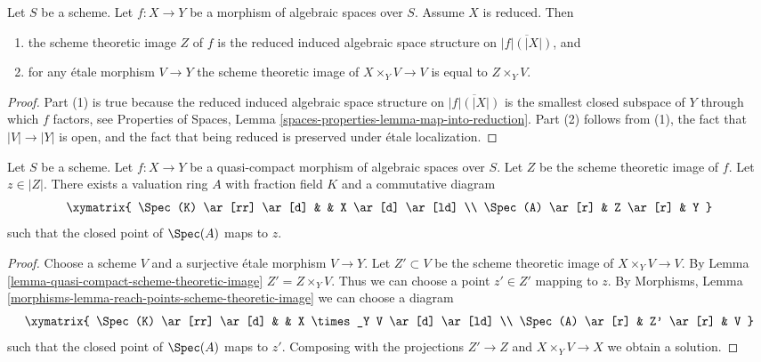 \begin{lemma}
\label{lemma-scheme-theoretic-image-reduced}
Let $S$ be a scheme. Let $f : X \to Y$ be a morphism of algebraic spaces
over $S$. Assume $X$ is reduced. Then
\begin{enumerate}
\item the scheme theoretic image $Z$ of $f$ is the reduced induced algebraic
space structure on $\overline{|f|(|X|)}$, and
\item for any \'etale morphism $V \to Y$ the scheme theoretic image of
$X \times_Y V \to V$ is equal to $Z \times_Y V$.
\end{enumerate}
\end{lemma}

\begin{proof}
Part (1) is true because the reduced induced algebraic space structure on
$\overline{|f|(|X|)}$ is the smallest closed subspace
of $Y$ through which $f$ factors, see
Properties of Spaces, Lemma \ref{spaces-properties-lemma-map-into-reduction}.
Part (2) follows from (1), the fact that $|V| \to |Y|$ is open, and the
fact that being reduced is preserved under \'etale localization.
\end{proof}

\begin{lemma}
\label{lemma-reach-points-scheme-theoretic-image}
Let $S$ be a scheme.
Let $f : X \to Y$ be a quasi-compact morphism of algebraic spaces over $S$.
Let $Z$ be the scheme theoretic image of $f$.
Let $z \in |Z|$. There exists a valuation ring $A$ with
fraction field $K$ and a commutative diagram
$$
\xymatrix{
\Spec(K) \ar[rr] \ar[d] & & X \ar[d] \ar[ld] \\
\Spec(A) \ar[r] & Z \ar[r] & Y
}
$$
such that the closed point of $\Spec(A)$ maps to $z$.
\end{lemma}

\begin{proof}
Choose a scheme $V$ and a surjective \'etale morphism $V \to Y$.
Let $Z' \subset V$ be the scheme theoretic image of $X \times_Y V \to V$.
By Lemma \ref{lemma-quasi-compact-scheme-theoretic-image}
$Z' = Z \times_Y V$. Thus we can choose a point $z' \in Z'$ mapping to $z$.
By Morphisms, Lemma \ref{morphisms-lemma-reach-points-scheme-theoretic-image}
we can choose a diagram
$$
\xymatrix{
\Spec(K) \ar[rr] \ar[d] & & X \times_Y V \ar[d] \ar[ld] \\
\Spec(A) \ar[r] & Z' \ar[r] & V
}
$$
such that the closed point of $\Spec(A)$ maps to $z'$.
Composing with the projections $Z' \to Z$ and $X \times_Y V \to X$
we obtain a solution.
\end{proof}








